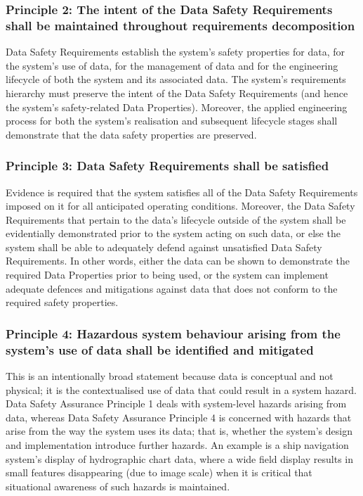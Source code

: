 \subsubsection{Principle 2: The intent of the Data Safety Requirements shall be maintained throughout requirements decomposition}
Data Safety Requirements establish the system's safety properties for data, for the system's use of data, for the management of data and for the engineering lifecycle of both the system and its associated data. The system's requirements hierarchy must preserve the intent of the Data Safety Requirements (and hence the system's safety-related Data Properties). Moreover, the applied engineering process for both the system's realisation and subsequent lifecycle stages shall demonstrate that the data safety properties are preserved.

\subsubsection{Principle 3: Data Safety Requirements shall be satisfied}
Evidence is required that the system satisfies all of the Data Safety Requirements imposed on it for all anticipated operating conditions. Moreover, the Data Safety Requirements that pertain to the data's lifecycle outside of the system shall be evidentially demonstrated prior to the system acting on such data, or else the system shall be able to adequately defend against unsatisfied Data Safety Requirements. In other words, either the data can be shown to demonstrate the required Data Properties prior to being used, or the system can implement adequate defences and mitigations against data that does not conform to the required safety properties.

\subsubsection{Principle 4: Hazardous system behaviour arising from the system's use of data shall be identified and mitigated}
This is an intentionally broad statement because data is conceptual and not physical; it is the contextualised use of data that could result in a system hazard. Data Safety Assurance Principle 1 deals with system-level hazards arising from data, whereas Data Safety Assurance Principle 4 is concerned with hazards that arise from the way the system uses its data; that is, whether the system's design and implementation introduce further hazards. An example is a ship navigation system's display of hydrographic chart data, where a wide field display results in small features disappearing (due to image scale) when it is critical that situational awareness of such hazards is maintained.

